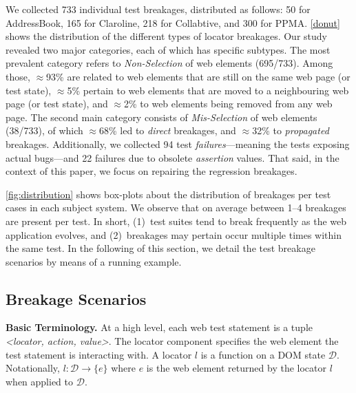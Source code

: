\label{sec:study}
We collected 733 individual test breakages, distributed as follows: 50 for AddressBook, 165 for Claroline, 218 for Collabtive, and 300 for PPMA.
\autoref{donut} shows the distribution of the different types of locator breakages. Our study revealed two major categories, each of which has specific subtypes. The most prevalent category refers to \textit{Non-Selection} of web elements (695/733). Among those, $\approx$93\% are related to web elements that are still on the same web page (or test state), $\approx$5\% pertain to web elements that are moved to a neighbouring web page (or test state), and $\approx$2\% to web elements being removed from any web page.
The second main category consists of \textit{Mis-Selection} of web elements (38/733), of which $\approx$68\% led to \textit{direct} breakages, and $\approx$32\% to \textit{propagated} breakages. 
Additionally, we collected 94 test \textit{failures}---meaning the tests exposing actual bugs---and 22 failures due to obsolete \textit{assertion} values.
%
That said, in the context of this paper, we focus on repairing the regression breakages. 

\autoref{fig:distribution} shows box-plots about the distribution of breakages per test cases in each subject system. We observe that on average between 1--4 breakages are present per test. 
In short, (1)~test suites tend to break frequently as the web application evolves, and (2)~breakages may pertain occur multiple times within the same test. 
In the following of this section, we detail the test breakage scenarios by means of a running example.

\subsection{Breakage Scenarios}\label{sec:breakage-scenarios}

\noindent
\textbf{Basic Terminology.}
At a high level, each web test statement is a tuple \textit{<locator, action, value>}. 
The locator component specifies the web element the test statement is interacting with. A locator $l$ is a function on a DOM state $\mathcal{D}$. Notationally, $l: \mathcal{D} \rightarrow \{e\}$ where $e$ is the web element returned by the locator $l$ when applied to $\mathcal{D}$. 
%



